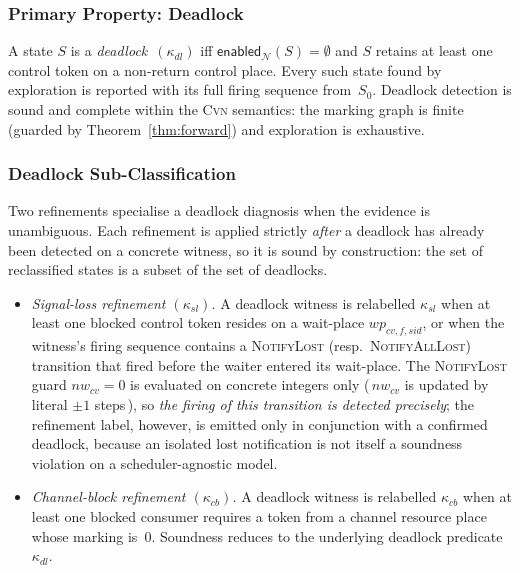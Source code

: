 \subsubsection{Primary Property: Deadlock}
\label{subsubsec:deadlock}

A state $S$ is a \emph{deadlock}~$(\kappa_{dl})$ iff
$\mathsf{enabled}_{\mathcal{N}}(S)=\emptyset$ and $S$ retains at least
one control token on a non-return control place. Every such state found
by exploration is reported with its full firing sequence from~$S_0$.
Deadlock detection is sound and complete within the \textsc{Cvn}
semantics: the marking graph is finite (guarded by
Theorem~\ref{thm:forward}) and exploration is exhaustive.

\subsubsection{Deadlock Sub-Classification}
\label{subsubsec:deadlock-subclass}

Two refinements specialise a deadlock diagnosis when the evidence is
unambiguous. Each refinement is applied strictly \emph{after} a
deadlock has already been detected on a concrete witness, so it is
sound by construction: the set of reclassified states is a subset of
the set of deadlocks.

\begin{itemize}[leftmargin=1.5em]
  \item \emph{Signal-loss refinement\/ $(\kappa_{sl})$.}\;
    A deadlock witness is relabelled $\kappa_{sl}$ when at least one
    blocked control token resides on a wait-place
    $wp_{cv,f,\mathit{sid}}$, or when the witness's firing sequence
    contains a \textsc{NotifyLost} (resp.~\textsc{NotifyAllLost})
    transition that fired before the waiter entered its wait-place.
    The \textsc{NotifyLost} guard $nw_{cv}=0$ is evaluated on concrete
    integers only (\,$nw_{cv}$ is updated by literal $\pm 1$ steps\,),
    so \emph{the firing of this transition is detected precisely};
    the refinement label, however, is emitted only in conjunction with
    a confirmed deadlock, because an isolated lost notification is not
    itself a soundness violation on a scheduler-agnostic model.

  \item \emph{Channel-block refinement\/ $(\kappa_{cb})$.}\;
    A deadlock witness is relabelled $\kappa_{cb}$ when at least one
    blocked consumer requires a token from a channel resource place
    whose marking is~$0$. Soundness reduces to the underlying
    deadlock predicate $\kappa_{dl}$.
\end{itemize}


